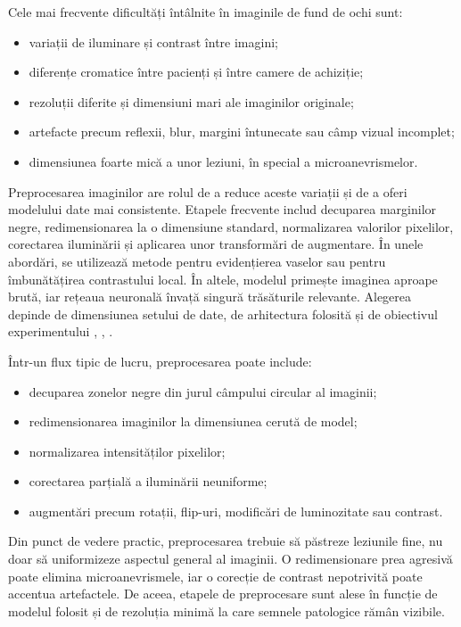 \documentclass[12pt, a4paper, twoside, romanian]{teza-upb}
\begin{document}
Cele mai frecvente dificultăți întâlnite în imaginile de fund de ochi sunt:

\begin{itemize}
  \item variații de iluminare și contrast între imagini;
  \item diferențe cromatice între pacienți și între camere de achiziție;
  \item rezoluții diferite și dimensiuni mari ale imaginilor originale;
  \item artefacte precum reflexii, blur, margini întunecate sau câmp vizual incomplet;
  \item dimensiunea foarte mică a unor leziuni, în special a microanevrismelor.
\end{itemize}

\bigskip

Preprocesarea imaginilor are rolul de a reduce aceste variații și de a
oferi modelului date mai consistente. Etapele frecvente includ decuparea marginilor negre, redimensionarea
la o dimensiune standard, normalizarea valorilor pixelilor, corectarea iluminării și aplicarea unor
transformări de augmentare. În unele abordări, se utilizează metode pentru evidențierea vaselor
sau pentru îmbunătățirea contrastului local. În altele, modelul primește imaginea aproape brută,
iar rețeaua neuronală învață singură trăsăturile relevante. Alegerea depinde de dimensiunea setului
de date, de arhitectura folosită și de obiectivul experimentului
\cite{2_sopharak2009automatic}, \cite{13_staal2004ridge}, \cite{9_chetoui2020explainable}.
\bigskip

Într-un flux tipic de lucru, preprocesarea poate include:

\begin{itemize}
  \item decuparea zonelor negre din jurul câmpului circular al imaginii;
  \item redimensionarea imaginilor la dimensiunea cerută de model;
  \item normalizarea intensităților pixelilor;
  \item corectarea parțială a iluminării neuniforme;
  \item augmentări precum rotații, flip-uri, modificări de luminozitate sau contrast.
\end{itemize}

\bigskip

Din punct de vedere practic, preprocesarea trebuie să păstreze leziunile fine, nu
doar să uniformizeze aspectul general al imaginii. O redimensionare prea agresivă poate
elimina microanevrismele, iar o corecție de contrast nepotrivită poate accentua artefactele. De
aceea, etapele de preprocesare sunt alese în funcție de modelul folosit și
de rezoluția minimă la care semnele patologice rămân vizibile.
\bigskip
\end{document}
